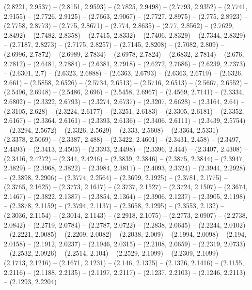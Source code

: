 {   (2.8221, 2.9537) -- (2.8151, 2.9593) -- (2.7825, 2.9498) -- (2.7793, 2.9352) 
  -- (2.7741, 2.9155) -- (2.7726, 2.9125) -- (2.7663, 2.9067) -- (2.7727, 
  2.8975) -- (2.775, 2.8923) -- (2.7758, 2.8773) -- (2.775, 2.8671) -- (2.774, 
  2.8635) -- (2.77, 2.8562) -- (2.7629, 2.8492) -- (2.7482, 2.8358) -- (2.7415, 
  2.8332) -- (2.7406, 2.8329) -- (2.7344, 2.8329) -- (2.7187, 2.8273) -- 
  (2.7175, 2.8257) -- (2.7145, 2.8208) -- (2.7082, 2.809) -- (2.6996, 2.7872) --
   (2.6989, 2.7834) -- (2.6978, 2.7824) -- (2.6832, 2.7814) -- (2.676, 2.7812) 
  -- (2.6481, 2.7884) -- (2.6381, 2.7918) -- (2.6272, 2.7686) -- (2.6239, 
  2.7373) -- (2.6301, 2.7) -- (2.6323, 2.6888) -- (2.6363, 2.6793) -- (2.6363, 
  2.6719) -- (2.6326, 2.661) -- (2.5858, 2.6526) -- (2.5734, 2.6513) -- (2.5716,
   2.6513) -- (2.5667, 2.6552) -- (2.5496, 2.6948) -- (2.5486, 2.696) -- 
  (2.5458, 2.6967) -- (2.4569, 2.7141) -- (2.3334, 2.6802) -- (2.3322, 2.6793) 
  -- (2.3274, 2.6737) -- (2.3207, 2.6628) -- (2.3164, 2.64) -- (2.3105, 2.628) 
  -- (2.3224, 2.6177) -- (2.3251, 2.6183) -- (2.3305, 2.6181) -- (2.3352, 
  2.6167) -- (2.3364, 2.6161) -- (2.3393, 2.6136) -- (2.3406, 2.6111) -- 
  (2.3439, 2.5754) -- (2.3294, 2.5672) -- (2.3326, 2.5629) -- (2.333, 2.5608) --
   (2.3364, 2.5331) -- (2.3378, 2.5069) -- (2.3387, 2.488) -- (2.3422, 2.4601) 
  -- (2.3431, 2.458) -- (2.3497, 2.4493) -- (2.3413, 2.4503) -- (2.3393, 2.4498)
   -- (2.3396, 2.444) -- (2.3407, 2.4308) -- (2.3416, 2.4272) -- (2.344, 2.4246)
   -- (2.3839, 2.3846) -- (2.3875, 2.3844) -- (2.3947, 2.3829) -- (2.3968, 
  2.3822) -- (2.3984, 2.3811) -- (2.4093, 2.3324) -- (2.3944, 2.2928) -- 
  (2.3898, 2.2906) -- (2.3774, 2.2564) -- (2.3699, 2.1925) -- (2.3781, 2.1775) 
  -- (2.3765, 2.1625) -- (2.3773, 2.1617) -- (2.3737, 2.1527) -- (2.3724, 
  2.1507) -- (2.3674, 2.1467) -- (2.3822, 2.1387) -- (2.3854, 2.1364) -- 
  (2.3906, 2.1237) -- (2.3905, 2.1198) -- (2.3878, 2.1159) -- (2.3794, 2.1137) 
  -- (2.3658, 2.1295) -- (2.3553, 2.132) -- (2.3036, 2.1154) -- (2.3014, 2.1143)
   -- (2.2918, 2.1075) -- (2.2773, 2.0907) -- (2.2738, 2.0842) -- (2.2719, 
  2.0784) -- (2.2787, 2.0722) -- (2.2838, 2.0645) -- (2.2244, 2.0102) -- 
  (2.2221, 2.0085) -- (2.2209, 2.0082) -- (2.2038, 2.009) -- (2.1994, 2.0098) --
   (2.194, 2.0158) -- (2.1912, 2.0237) -- (2.1946, 2.0315) -- (2.2108, 2.0659) 
  -- (2.2319, 2.0733) -- (2.2532, 2.0926) -- (2.2514, 2.104) -- (2.2529, 2.1099)
   -- (2.2309, 2.1099) -- (2.1713, 2.1216) -- (2.1671, 2.1231) -- (2.146, 
  2.1325) -- (2.1326, 2.1416) -- (2.1155, 2.2116) -- (2.1188, 2.2135) -- 
  (2.1197, 2.2117) -- (2.1237, 2.2103) -- (2.1246, 2.2113) -- (2.1293, 2.2204) 
}
